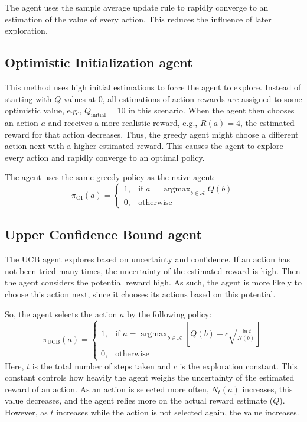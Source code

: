 \documentclass[sigconf,nonacm]{acmart}
\newcommand{\argmax}{\mathop{\mathrm{argmax}}}
\begin{document}
The agent uses the sample average update rule to rapidly converge to an estimation of the value of every action. This reduces the influence of later exploration.

\subsection{Optimistic Initialization agent}
This method uses high initial estimations to force the agent to explore. 
Instead of starting with $Q$-values at $0$, all estimations of action rewards are assigned to some optimistic value, e.g., $Q_{\text{initial}}=10$ in this scenario. 
When the agent then chooses an action $a$ and receives a more realistic reward, e.g., $R(a)=4$, the estimated reward for that action decreases. Thus, the greedy agent might choose a different action next with a higher estimated reward. This causes the agent to explore every action and rapidly converge to an optimal policy.

The agent uses the same greedy policy as the naive agent:
\begin{equation}
    \pi_{\text{OI}}(a)=\begin{cases}
        1, & \text{if } a=\argmax_{b\in\mathcal{A}}Q(b) \\
        0, & \text{otherwise}
    \end{cases}
\end{equation}

\subsection{Upper Confidence Bound agent}
The UCB agent explores based on uncertainty and confidence. 
If an action has not been tried many times, the uncertainty of the estimated reward is high. Then the agent considers the potential reward high. As such, the agent is more likely to choose this action next, since it chooses its actions based on this potential.

So, the agent selects the action $a$ by the following policy:
\begin{equation}
    \pi_{\text{UCB}}(a)=\begin{cases}
        1, & \text{if } a=\argmax_{b\in\mathcal{A}}\left[Q(b)+c\sqrt{\frac{\ln t}{N(b)}}\right] \\
        0, & \text{otherwise}
    \end{cases}
\end{equation}
Here, $t$ is the total number of steps taken and $c$ is the exploration constant. This constant controls how heavily the agent weighs the uncertainty of the estimated reward of an action. As an action is selected more often, $N_t(a)$ increases, this value decreases, and the agent relies more on the actual reward estimate ($Q$). However, as $t$ increases while the action is not selected again, the value increases.
\end{document}
